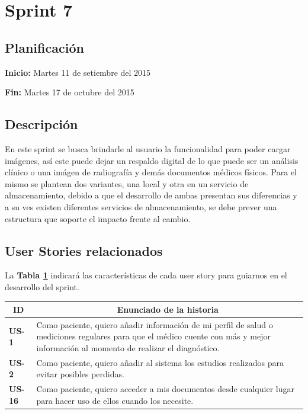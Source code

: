 \documentclass[a4paper,12pt]{article}
\begin{document}

\section{Sprint 7} %

\subsection{Planificación}

\textbf{Inicio: }Martes 11 de setiembre del 2015 

\textbf{Fin:} Martes 17 de octubre del 2015



\subsection{Descripción}

En este sprint se busca brindarle al usuario la funcionalidad para poder cargar imágenes, así este puede dejar un respaldo digital de lo que puede ser un análisis clínico o una imágen de radiografía y demás documentos médicos físicos. Para el mismo se plantean dos variantes, una local y otra en un servicio de almacenamiento, debido a que el desarrollo de ambas presentan sus diferencias y a su ves existen diferentes servicios de almacenamiento, se debe prever una estructura que soporte el impacto frente al cambio.

\subsection{User Stories relacionados}
La \textbf{Tabla \ref{US-Sprint6} } indicará las características de cada user story para guiarnos en el desarrollo del sprint.
\begin{table}[h]
    \label{US-Sprint6}
    \centering
	\begin{tabular}{|l|p{9cm}|}
	\hline
        \multicolumn{1}{|c|}{\textbf{ID}} &
        \multicolumn{1}{|c|}{\textbf{Enunciado de la historia}} \\          
    \hline
        \textbf{US-1 } & Como paciente, quiero  añadir información de mi perfil de salud o mediciones regulares para que el médico cuente con más y mejor información al momento de realizar el diagnóstico. \\
     \hline 
    \hline
        \textbf{US-2 } & Como paciente, quiero añadir al sistema los estudios realizados para evitar posibles perdidas.\\
     \hline 
     \hline
        \textbf{US-16 } & Como paciente, quiero acceder a mis documentos desde cualquier lugar para hacer uso de ellos cuando los necesite.\\
     \hline   
     
    \end{tabular}
\end{table}
\end{document}
